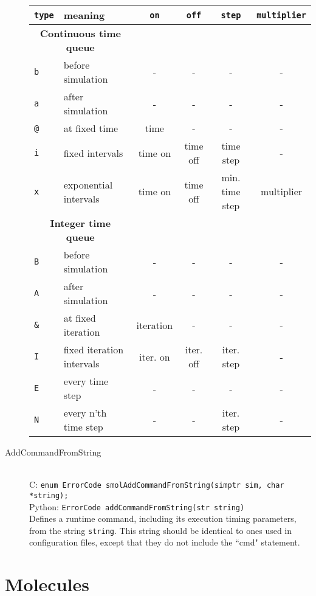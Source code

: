 \documentclass {book}
\begin{document}
\begin{description}
\begin{longtable}[c]{ll|cccc}
\texttt{type} & meaning & \texttt{on} & \texttt{off} & \texttt{step} & \texttt{multiplier}\\
\hline
\multicolumn{2}{c}{\textbf{Continuous time queue}}\\
\texttt{b} & before simulation & - & - & - & -\\
\texttt{a} & after simulation & - & - & - & -\\
\texttt{@} & at fixed time & time & - & - & -\\
\texttt{i} & fixed intervals & time on & time off & time step & -\\
\texttt{x} & exponential intervals & time on & time off & min. time step & multiplier\\
\hline
\multicolumn{2}{c}{\textbf{Integer time queue}}\\
\texttt{B} & before simulation & - & - & - & -\\
\texttt{A} & after simulation & - & - & - & -\\
\texttt{\&} & at fixed iteration & iteration & - & - & -\\
\texttt{I} & fixed iteration intervals & iter. on & iter. off & iter. step & -\\
\texttt{E} & every time step & - & - & - & -\\
\texttt{N} & every n'th time step & - & - & iter. step & -\\
\end{longtable}

\item[AddCommandFromString]
\hfill \\
C: \texttt{enum ErrorCode smolAddCommandFromString(simptr sim, char *string);}\\
Python: \texttt{ErrorCode addCommandFromString(str string)}\\
Defines a runtime command, including its execution timing parameters, from the string \texttt{string}. This string should be identical to ones used in configuration files, except that they do not include the ``cmd" statement.

\end{description}

\section{Molecules}
\end{document}
